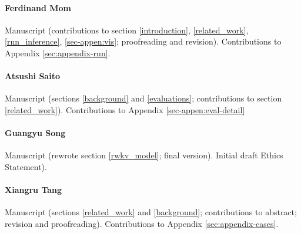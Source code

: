 \documentclass[11pt]{article}
\begin{document}
\paragraph{Ferdinand Mom} Manuscript (contributions to section \ref{introduction}, \ref{related_work}, \ref{rnn_inference}, \ref{sec-appen:vis}; proofreading and revision). Contributions to Appendix \ref{sec:appendix-rnn}.

\paragraph{Atsushi Saito}  Manuscript (sections \ref{background} and \ref{evaluations}; contributions to section \ref{related_work}). %
Contributions to Appendix \ref{sec-appen:eval-detail}

\paragraph{Guangyu Song} Manuscript (rewrote section \ref{rwkv_model}; final version). Initial draft Ethics Statement). 

\paragraph{Xiangru Tang} Manuscript (sections \ref{related_work} and \ref{background}; contributions to abstract; revision and proofreading). Contributions to Appendix \ref{sec:appendix-cases}. 
\end{document}
